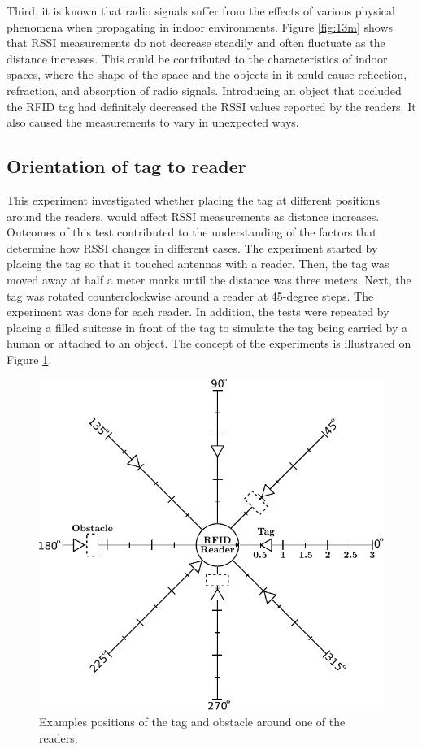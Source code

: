 Third, it is known that radio signals suffer from the effects of various physical phenomena when propagating in indoor environments. Figure \ref{fig:13m} shows that RSSI measurements do not decrease steadily and often fluctuate as the distance increases. This could be contributed to the characteristics of indoor spaces, where the shape of the space and the objects in it could cause reflection, refraction, and absorption of radio signals. Introducing an object that occluded the RFID tag had definitely decreased the RSSI values reported by the readers. It also caused the measurements to vary in unexpected ways.


\subsection{Orientation of tag to reader}

This experiment investigated whether placing the tag at different positions around the readers, would affect RSSI measurements as distance increases. Outcomes of this test contributed to the understanding of the factors that determine how RSSI changes in different cases. The experiment started by placing the tag so that it touched antennas with a reader. Then, the tag was moved away at half a meter marks until the distance was three meters. Next, the tag was rotated counterclockwise around a reader at 45-degree steps. The experiment was done for each reader. In addition, the tests were repeated by placing a filled suitcase in front of the tag to simulate the tag being carried by a human or attached to an object. The concept of the experiments is illustrated on Figure \ref{fig:ori}.
\begin{figure}[h]
	\begin{center}
		\includegraphics[width=.5\textwidth]{figures/exp/orientation}
		\caption{Examples positions of the tag and obstacle around one of the readers.}
		\label{fig:ori}
	\end{center}
\end{figure}

